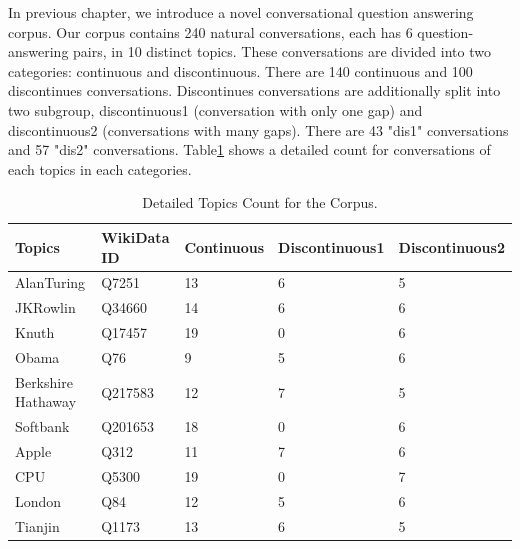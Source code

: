 \documentclass[bsc,frontabs,twoside,singlespacing,parskip,deptreport]{infthesis}     %
\begin{document}
In previous chapter, we introduce a novel conversational question answering corpus. Our corpus contains 240 natural conversations, each has 6 question-answering pairs, in 10 distinct topics. These conversations are divided into two categories: continuous and discontinuous. There are 140 continuous and 100 discontinues conversations. Discontinues conversations are additionally split into two subgroup, discontinuous1 (conversation with only one gap) and discontinuous2 (conversations with many gaps). There are 43 "dis1" conversations and 57 "dis2" conversations. Table\ref{tab:topiccount} shows a detailed count for conversations of each topics in each categories.

\begin{table}[]
\begin{tabular}{|l|l|l|l|l|}
\hline
Topics             & WikiData ID & Continuous & Discontinuous1 & Discontinuous2 \\ \hline
AlanTuring         & Q7251       & 13         & 6              & 5              \\ \hline
JKRowlin           & Q34660      & 14         & 6              & 6              \\ \hline
Knuth              & Q17457      & 19         & 0              & 6              \\ \hline
Obama              & Q76         & 9          & 5              & 6              \\ \hline
Berkshire Hathaway & Q217583     & 12         & 7              & 5              \\ \hline
Softbank           & Q201653     & 18         & 0              & 6              \\ \hline
Apple              & Q312        & 11         & 7              & 6              \\ \hline
CPU                & Q5300       & 19         & 0              & 7              \\ \hline
London             & Q84         & 12         & 5              & 6              \\ \hline
Tianjin            & Q1173       & 13         & 6              & 5              \\ \hline
\end{tabular}
\caption{Detailed Topics Count for the Corpus.}
\label{tab:topiccount}
\end{table}
\end{document}
